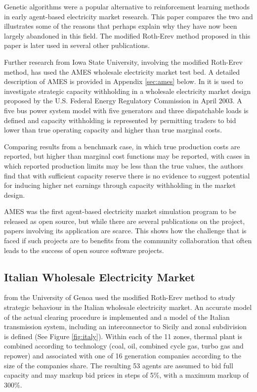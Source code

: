Genetic algorithms were a popular alternative to reinforcement learning methods
in early agent-based electricity market research.  This paper compares the two
and illustrates some of the reasons that perhaps explain why they have now been
largely abandoned in this field. The modified Roth-Erev method proposed in this
paper is later used in several other publications.

Further research from Iowa State University, involving the modified Roth-Erev
method, has used the AMES wholesale electricity market test bed.  A
detailed description of AMES is provided in Appendix \ref{sec:ames} below.  In
 it is used to investigate strategic capacity
withholding in a wholesale electricity market design proposed by the U.S.
Federal Energy Regulatory Commission in April 2003.  A five bus power system model
with five generators and three dispatchable loads is defined and capacity
withholding is represented by permitting traders to bid lower than true
operating capacity and higher than true marginal costs.

Comparing results from a benchmark case, in which true production costs are
reported, but higher than marginal cost functions may be reported, with cases
in which reported production limits may be less than the true values, the authors
find that with sufficient capacity reserve there is no evidence to suggest
potential for inducing higher net earnings through capacity withholding in the
market design.

AMES was the first agent-based electricity market simulation program to be
released as open source, but while there are several publications on the
project, papers involving its application are scarce.  This shows how the
challenge that is faced if such projects are to benefits from the community
collaboration that often leads to the success of open source software projects.

\subsection{Italian Wholesale Electricity Market}


 from the University of Genoa used the modified Roth-Erev
method to study strategic behaviour in the Italian wholesale electricity market.
 An accurate model of the actual clearing procedure is implemented and a model
of the Italian transmission system, including an interconnector to Sicily and
zonal subdivision is defined (See Figure \ref{fig:italy}). Within each of the 11
zones, thermal plant is combined according to technology (coal, oil, combined
cycle gas, turbo gas and repower) and associated with one of 16 generation
companies according to the size of the companies share.  The resulting 53 agents
are assumed to bid full capacity and may markup bid prices in steps of 5\%, with
a maximum markup of 300\%.

